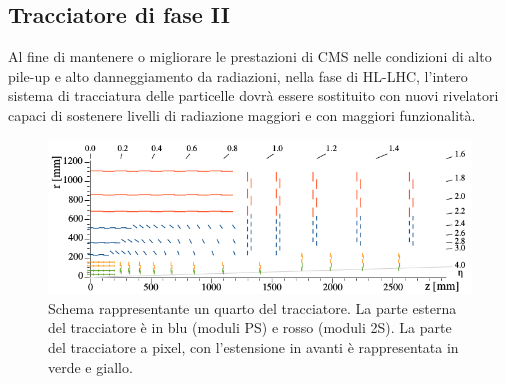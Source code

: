 \subsection{Tracciatore di fase II}

Al fine di mantenere o migliorare le prestazioni di CMS nelle condizioni di alto pile-up e alto danneggiamento da radiazioni, nella fase  di HL-LHC, l'intero sistema di tracciatura delle particelle dovrà essere sostituito con nuovi rivelatori capaci di sostenere livelli di radiazione maggiori e con maggiori funzionalità.
\begin{figure}
\centering
\includegraphics[scale=0.4]{Immagini/TrackerPhaseII}
\caption{Schema rappresentante un quarto del tracciatore. La parte esterna del tracciatore è in blu (moduli PS) e rosso (moduli 2S). La parte del tracciatore a pixel, con l'estensione in avanti è rappresentata in verde e giallo.}
\label{TrackerPhaseII}
\end{figure}

